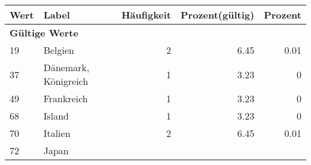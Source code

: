      \begin{longtable}{lXrrr}
     \toprule
     \textbf{Wert} & \textbf{Label} & \textbf{Häufigkeit} & \textbf{Prozent(gültig)} & \textbf{Prozent} \\
     \endhead
     \midrule
     \multicolumn{5}{l}{\textbf{Gültige Werte}}\\

     19 &
     \multicolumn{1}{X}{ Belgien   } &


       \num{2} &
       \num[round-mode=places,round-precision=2]{6.45} &
         \num[round-mode=places,round-precision=2]{0.01} \\

     37 &
     \multicolumn{1}{X}{ Dänemark, Königreich   } &


       \num{1} &
       \num[round-mode=places,round-precision=2]{3.23} &
         \num[round-mode=places,round-precision=2]{0} \\

     49 &
     \multicolumn{1}{X}{ Frankreich   } &


       \num{1} &
       \num[round-mode=places,round-precision=2]{3.23} &
         \num[round-mode=places,round-precision=2]{0} \\

     68 &
     \multicolumn{1}{X}{ Island   } &


       \num{1} &
       \num[round-mode=places,round-precision=2]{3.23} &
         \num[round-mode=places,round-precision=2]{0} \\

     70 &
     \multicolumn{1}{X}{ Italien   } &


       \num{2} &
       \num[round-mode=places,round-precision=2]{6.45} &
         \num[round-mode=places,round-precision=2]{0.01} \\

     72 &
     \multicolumn{1}{X}{ Japan   } &



\end{longtable}
